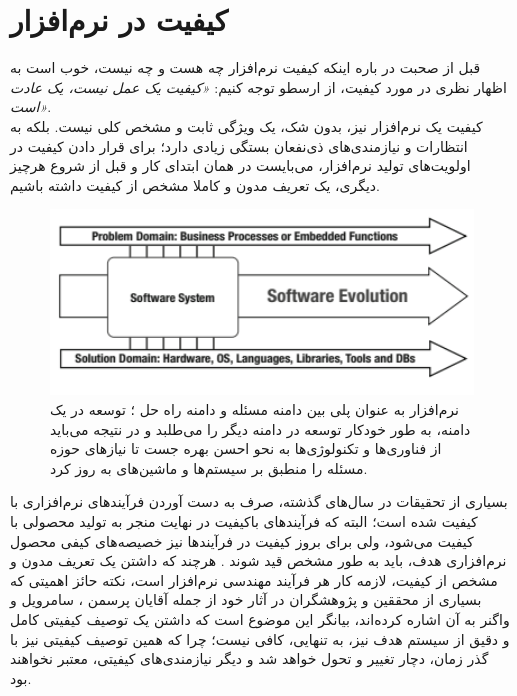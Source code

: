\section{کیفیت در نرم‌افزار}
قبل از صحبت در باره اینکه کیفیت نرم‌افزار چه هست و چه نیست، خوب است به اظهار نظری در مورد کیفیت، از ارسطو توجه کنیم:
\emph{	«کیفیت یک عمل نیست، یک عادت است»}.\\
کیفیت یک نرم‌افزار نیز، بدون شک، یک ویژگی ثابت و مشخص کلی نیست. بلکه به انتظارات و نیازمندی‌های ذی‌نفعان بستگی زیادی دارد؛ برای قرار دادن کیفیت در اولویت‌های تولید نرم‌افزار، می‌بایست در همان ابتدای کار و قبل از شروع هرچیز دیگری، یک تعریف مدون و کاملا مشخص از کیفیت داشته باشیم.\\
\begin{figure}
	\centering\includegraphics[width=12cm]{Resources/mediator.PNG}
	\caption[نرم‌افزار به عنوان پلی بین دامنه مسئله و دامنه راه‌ حل]
	{نرم‌افزار به عنوان پلی بین دامنه مسئله و دامنه راه‌ حل
		\cite{wagner_software_2013}؛
		توسعه در یک دامنه، به طور خودکار توسعه در دامنه دیگر را می‌طلبد و در نتیجه می‌باید از فناوری‌ها و تکنولوژی‌ها به نحو احسن بهره جست تا نیازهای حوزه مسئله را منطبق بر سیستم‌ها و ماشین‌های به روز کرد.
	}
	\label{fig:mediator}
\end{figure}
بسیاری از تحقیقات در سال‌های گذشته، صرف به دست آوردن فرآیندهای نرم‌افزاری با کیفیت شده است؛ البته که فرآیندهای باکیفیت در نهایت منجر به تولید محصولی با کیفیت می‌شود، ولی برای بروز کیفیت در فرآیندها نیز خصیصه‌های کیفی
محصول نرم‌افزاری هدف، باید به طور مشخص قید شوند
\cite{sommerville_software_2016}.
هرچند که داشتن یک تعریف مدون و مشخص از کیفیت، لازمه کار هر فرآیند مهندسی نرم‌افزار است، نکته حائز اهمیتی که بسیاری از محققین و پژوهشگران در آثار خود از جمله آقایان پرسمن
\cite{pressman_software_2015}،
سامرویل
\cite{sommerville_software_2016}
و واگنر
\cite{wagner_software_2013}
به آن اشاره کرده‌اند، بیانگر این موضوع است که داشتن یک توصیف کیفیتی  کامل و دقیق از سیستم هدف نیز، به تنهایی، کافی نیست؛ چرا که همین توصیف کیفیتی نیز با گذر زمان، دچار تغییر و تحول خواهد شد و دیگر نیازمندی‌های کیفیتی، معتبر نخواهند بود.\\
